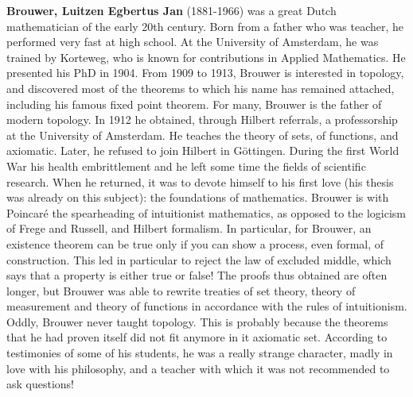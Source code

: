 \textbf{Brouwer, Luitzen Egbertus Jan} (1881-1966) was a great Dutch mathematician of the early 20th century. Born from a father who was teacher, he performed very fast at high school. At the University of Amsterdam, he was trained by Korteweg, who is known for contributions in Applied Mathematics. He presented his PhD in 1904. From 1909 to 1913, Brouwer is interested in topology, and discovered most of the theorems to which his name has remained attached, including his famous fixed point theorem. For many, Brouwer is the father of modern topology. In 1912 he obtained, through Hilbert referrals, a professorship at the University of Amsterdam. He teaches the theory of sets, of functions, and axiomatic. Later, he refused to join Hilbert in Göttingen. During the first World War his health embrittlement and he left some time the fields of scientific research. When he returned, it was to devote himself to his first love (his thesis was already on this subject): the foundations of mathematics. Brouwer is with Poincaré the spearheading of intuitionist mathematics, as opposed to the logicism of Frege and Russell, and Hilbert formalism. In particular, for Brouwer, an existence theorem can be true only if you can show a process, even formal, of construction. This led in particular to reject the law of excluded middle, which says that a property is either true or false! The proofs thus obtained are often longer, but Brouwer was able to rewrite treaties of set theory, theory of measurement and theory of functions in accordance with the rules of intuitionism. Oddly, Brouwer never taught topology. This is probably because the theorems that he had proven itself did not fit anymore in it axiomatic set. According to testimonies of some of his students, he was a really strange character, madly in love with his philosophy, and a teacher with which it was not recommended to ask questions!

{}
\label{sec:C}

